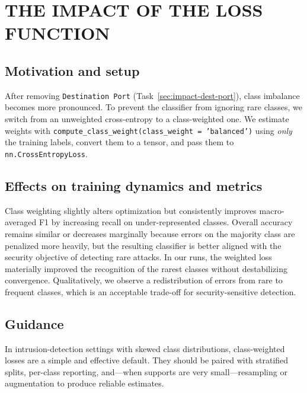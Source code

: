 
\section{THE IMPACT OF THE LOSS FUNCTION} \label{sec:impact-loss-function}

    \subsection{Motivation and setup}

        After removing \texttt{Destination Port} (Task~\ref{sec:impact-dest-port}), class imbalance becomes more pronounced. 
        To prevent the classifier from ignoring rare classes, we switch from an unweighted cross-entropy to a class-weighted one. 
        We estimate weights with \texttt{compute\_class\_weight(class\_weight = 'balanced')} using \emph{only} the training labels, convert them to a tensor, and pass them to \texttt{nn.CrossEntropyLoss}.

    \subsection{Effects on training dynamics and metrics}

        Class weighting slightly alters optimization but consistently improves macro-averaged F1 by increasing recall on under-represented classes. 
        Overall accuracy remains similar or decreases marginally because errors on the majority class are penalized more heavily, but the resulting classifier is better aligned with the security objective of detecting rare attacks. 
        In our runs, the weighted loss materially improved the recognition of the rarest classes without destabilizing convergence. 
        Qualitatively, we observe a redistribution of errors from rare to frequent classes, which is an acceptable trade-off for security-sensitive detection.

    \subsection{Guidance}

        In intrusion-detection settings with skewed class distributions, class-weighted losses are a simple and effective default. 
        They should be paired with stratified splits, per-class reporting, and---when supports are very small---resampling or augmentation to produce reliable estimates.
